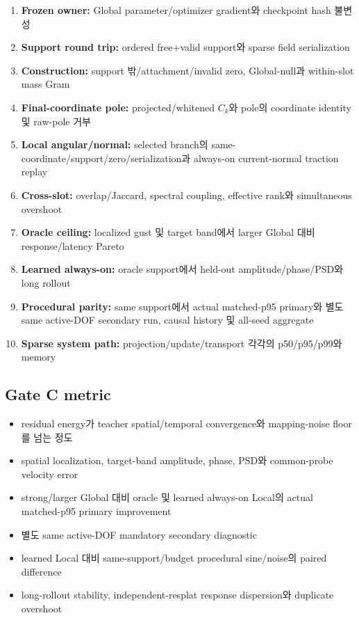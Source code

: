 \documentclass[10pt,a4paper]{article}
\begin{document}
\begin{enumerate}
  \item \textbf{Frozen owner:} Global parameter/optimizer gradient와 checkpoint hash 불변성
  \item \textbf{Support round trip:} ordered free+valid support와 sparse field serialization
  \item \textbf{Construction:} support 밖/attachment/invalid zero, Global-null과 within-slot mass Gram
  \item \textbf{Final-coordinate pole:} projected/whitened \(C_k\)와 pole의 coordinate identity 및 raw-pole 거부
  \item \textbf{Local angular/normal:} selected branch의 same-coordinate/support/zero/serialization과
  always-on current-normal traction replay
  \item \textbf{Cross-slot:} overlap/Jaccard, spectral coupling, effective rank와 simultaneous overshoot
  \item \textbf{Oracle ceiling:} localized gust 및 target band에서 larger Global 대비 response/latency Pareto
  \item \textbf{Learned always-on:} oracle support에서 held-out amplitude/phase/PSD와 long rollout
  \item \textbf{Procedural parity:} same support에서 actual matched-p95 primary와 별도 same active-DOF
  secondary run, causal history 및 all-seed aggregate
  \item \textbf{Sparse system path:} projection/update/transport 각각의 p50/p95/p99와 memory
\end{enumerate}

\subsection{Gate C metric}

\begin{itemize}
  \item residual energy가 teacher spatial/temporal convergence와 mapping-noise floor를 넘는 정도
  \item spatial localization, target-band amplitude, phase, PSD와 common-probe velocity error
  \item strong/larger Global 대비 oracle 및 learned always-on Local의 actual matched-p95 primary improvement
  \item 별도 same active-DOF mandatory secondary diagnostic
  \item learned Local 대비 same-support/budget procedural sine/noise의 paired difference
  \item long-rollout stability, independent-resplat response dispersion와 duplicate overshoot
\end{itemize}
\end{document}
